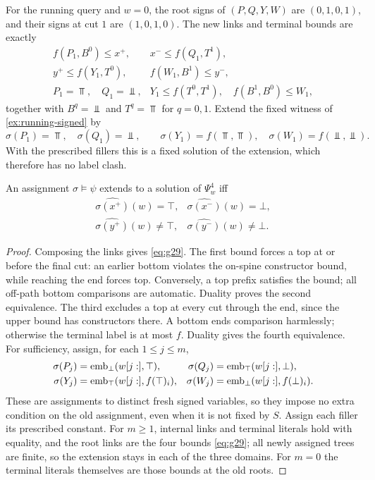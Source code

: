 \begin{example}\label{ex:running-spines}
For the running query and $w=0$, the root signs of $(P,Q,Y,W)$ are
$(0,1,0,1)$, and their signs at cut $1$ are $(1,0,1,0)$.
The new links and terminal bounds are exactly
\[
\begin{array}{ll}
 f(P_1,B^0)\le x^+,&x^-\le f(Q_1,T^1),\\
 y^+\le f(Y_1,T^0),&f(W_1,B^1)\le y^-,\\
 P_1=\Top,\quad Q_1=\Bot,&
 Y_1\le f(T^0,T^1),\quad f(B^1,B^0)\le W_1,
\end{array}
\]
together with $B^q=\Bot$ and $T^q=\Top$ for $q=0,1$.
Extend the fixed witness of \cref{ex:running-signed} by
\[
 \sigma(P_1)=\Top,\quad \sigma(Q_1)=\Bot,\qquad
 \sigma(Y_1)=f(\Top,\Top),\quad \sigma(W_1)=f(\Bot,\Bot).
\]
With the prescribed fillers this is a fixed solution of the extension,
which therefore has no label clash.
\end{example}

\begin{lemma}\label{lem:spine}
An assignment $\sigma\models\psi$ extends to a solution of $\Psi^4_w$ iff
\begin{equation}\label{eq:g18}
\begin{array}{ll}
 \widehat{\sigma(x^+)}(w)=\top,&\widehat{\sigma(x^-)}(w)=\bot,\\
 \widehat{\sigma(y^+)}(w)\ne\top,&\widehat{\sigma(y^-)}(w)\ne\bot.
\end{array}
\end{equation}
\end{lemma}
\begin{proof}
Composing the links gives \eqref{eq:g29}.
The first bound forces a top at or before the final cut: an earlier bottom
violates the on-spine constructor bound, while reaching the end forces top.
Conversely, a top prefix satisfies the bound; all off-path bottom comparisons
are automatic. Duality proves the second equivalence. The third excludes
a top at every cut through the end, since the upper bound has constructors
there. A bottom ends comparison harmlessly; otherwise the terminal label
is at most $f$. Duality gives the fourth equivalence.
For sufficiency, assign, for each $1\le j\le m$,
\[
\begin{aligned}
\sigma(P_j)&=\operatorname{emb}_\bot(w[j:],\top),&
\sigma(Q_j)&=\operatorname{emb}_\top(w[j:],\bot),\\
\sigma(Y_j)&=\operatorname{emb}_\top(w[j:],f(\top)_i),&
\sigma(W_j)&=\operatorname{emb}_\bot(w[j:],f(\bot)_i).
\end{aligned}
\]
These are assignments to distinct fresh signed variables, so they impose
no extra condition on the old assignment, even when it is not fixed by
$S$. Assign each filler its prescribed constant.
For $m\ge1$, internal links and terminal literals hold with equality, and the root links
are the four bounds \eqref{eq:g29}; all newly assigned trees are finite,
so the extension stays in each of the three domains.
For $m=0$ the terminal literals themselves are those bounds at the old roots.
\end{proof}

